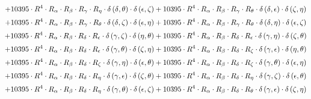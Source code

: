 \begin{subequations}
\begin{gather}
 \\[0.2em] \notag 		 + 10395 \cdot R^{4} \cdot R_{\alpha{}} \cdot R_{\beta{}} \cdot R_{\gamma{}} \cdot R_{\eta{}} \cdot \delta{}\left(\delta{}, \theta{}\right) \cdot \delta{}\left(\epsilon{}, \zeta{}\right)+ 10395 \cdot R^{4} \cdot R_{\alpha{}} \cdot R_{\beta{}} \cdot R_{\gamma{}} \cdot R_{\theta{}} \cdot \delta{}\left(\delta{}, \epsilon{}\right) \cdot \delta{}\left(\zeta{}, \eta{}\right) 
 \\[0.2em] \notag 		 + 10395 \cdot R^{4} \cdot R_{\alpha{}} \cdot R_{\beta{}} \cdot R_{\gamma{}} \cdot R_{\theta{}} \cdot \delta{}\left(\delta{}, \zeta{}\right) \cdot \delta{}\left(\epsilon{}, \eta{}\right)+ 10395 \cdot R^{4} \cdot R_{\alpha{}} \cdot R_{\beta{}} \cdot R_{\gamma{}} \cdot R_{\theta{}} \cdot \delta{}\left(\delta{}, \eta{}\right) \cdot \delta{}\left(\epsilon{}, \zeta{}\right) 
 \\[0.2em] \notag 		 + 10395 \cdot R^{4} \cdot R_{\alpha{}} \cdot R_{\beta{}} \cdot R_{\delta{}} \cdot R_{\epsilon{}} \cdot \delta{}\left(\gamma{}, \zeta{}\right) \cdot \delta{}\left(\eta{}, \theta{}\right)+ 10395 \cdot R^{4} \cdot R_{\alpha{}} \cdot R_{\beta{}} \cdot R_{\delta{}} \cdot R_{\epsilon{}} \cdot \delta{}\left(\gamma{}, \eta{}\right) \cdot \delta{}\left(\zeta{}, \theta{}\right) 
 \\[0.2em] \notag 		 + 10395 \cdot R^{4} \cdot R_{\alpha{}} \cdot R_{\beta{}} \cdot R_{\delta{}} \cdot R_{\epsilon{}} \cdot \delta{}\left(\gamma{}, \theta{}\right) \cdot \delta{}\left(\zeta{}, \eta{}\right)+ 10395 \cdot R^{4} \cdot R_{\alpha{}} \cdot R_{\beta{}} \cdot R_{\delta{}} \cdot R_{\zeta{}} \cdot \delta{}\left(\gamma{}, \epsilon{}\right) \cdot \delta{}\left(\eta{}, \theta{}\right) 
 \\[0.2em] \notag 		 + 10395 \cdot R^{4} \cdot R_{\alpha{}} \cdot R_{\beta{}} \cdot R_{\delta{}} \cdot R_{\zeta{}} \cdot \delta{}\left(\gamma{}, \eta{}\right) \cdot \delta{}\left(\epsilon{}, \theta{}\right)+ 10395 \cdot R^{4} \cdot R_{\alpha{}} \cdot R_{\beta{}} \cdot R_{\delta{}} \cdot R_{\zeta{}} \cdot \delta{}\left(\gamma{}, \theta{}\right) \cdot \delta{}\left(\epsilon{}, \eta{}\right) 
 \\[0.2em] \notag 		 + 10395 \cdot R^{4} \cdot R_{\alpha{}} \cdot R_{\beta{}} \cdot R_{\delta{}} \cdot R_{\eta{}} \cdot \delta{}\left(\gamma{}, \epsilon{}\right) \cdot \delta{}\left(\zeta{}, \theta{}\right)+ 10395 \cdot R^{4} \cdot R_{\alpha{}} \cdot R_{\beta{}} \cdot R_{\delta{}} \cdot R_{\eta{}} \cdot \delta{}\left(\gamma{}, \zeta{}\right) \cdot \delta{}\left(\epsilon{}, \theta{}\right) 
 \\[0.2em] \notag 		 + 10395 \cdot R^{4} \cdot R_{\alpha{}} \cdot R_{\beta{}} \cdot R_{\delta{}} \cdot R_{\eta{}} \cdot \delta{}\left(\gamma{}, \theta{}\right) \cdot \delta{}\left(\epsilon{}, \zeta{}\right)+ 10395 \cdot R^{4} \cdot R_{\alpha{}} \cdot R_{\beta{}} \cdot R_{\delta{}} \cdot R_{\theta{}} \cdot \delta{}\left(\gamma{}, \epsilon{}\right) \cdot \delta{}\left(\zeta{}, \eta{}\right) 

\end{gather}
\end{subequations}
